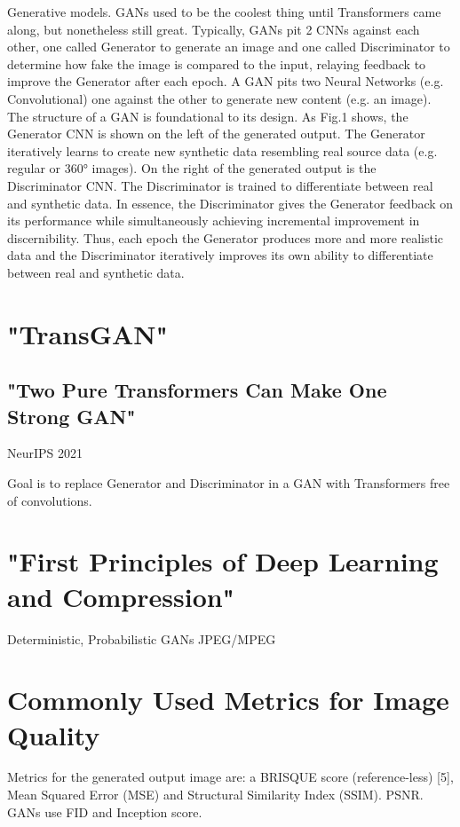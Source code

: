Generative models.
GANs used to be the coolest thing until Transformers came along, but nonetheless 
still great. Typically, GANs pit 2 CNNs against each other, one called Generator to 
generate an image and one called Discriminator to determine how fake the image is 
compared to the input, relaying feedback to improve the Generator after each epoch. 
A GAN pits two Neural Networks (e.g. Convolutional) one against the other to generate 
new content (e.g. an image). The structure of a GAN is foundational to its design. 
As Fig.1 shows, the Generator CNN is shown on the left of the generated output. 
The Generator iteratively learns to create new synthetic data resembling real source data 
(e.g. regular or 360° images).  On the right of the generated output is the Discriminator CNN.
The Discriminator is trained to differentiate between real and synthetic data. 
In essence, the Discriminator gives the Generator feedback on its performance while 
simultaneously achieving incremental improvement in discernibility. 
Thus, each epoch the Generator produces more and more realistic data and the Discriminator iteratively improves its own ability to differentiate between real and synthetic data.


\section{"TransGAN"}
\subsection{"Two Pure Transformers Can Make One Strong GAN"}
NeurIPS 2021

Goal is to replace Generator and Discriminator in a GAN with Transformers free of 
convolutions. 

\section{"First Principles of Deep Learning and Compression"}

Deterministic, Probabilistic
GANs
JPEG/MPEG

\section{Commonly Used Metrics for Image Quality}
Metrics for the generated output image are: a BRISQUE score (reference-less) [5], 
Mean Squared Error (MSE) and Structural Similarity Index (SSIM). PSNR.
GANs use FID and Inception score. 